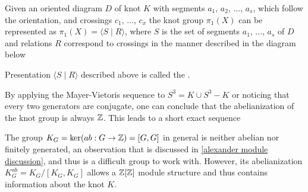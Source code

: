 \begin{definition}
  Given an oriented diagram $D$ of knot $K$ with segments $a_1$, $a_2$, ..., $a_s$, which follow the orientation, and crossings $c_1$, ..., $c_x$ the knot group $\pi_1(X)$ can be represented as $\pi_1(X)=\langle S\;|\;R\rangle$, where $S$ is the set of segments $a_1$, ..., $a_s$ of $D$ and relations $R$ correspond to crossings in the manner described in the diagram below
  \begin{center}
  \end{center}
  Presentation $\langle S\;|\;R\rangle$ described above is called the  \cite[Chapter~6]{livingstone}.
\end{definition}

By applying the Mayer-Vietoris sequence to $S^3=K\cup S^3-K$ or noticing that every two generators are conjugate, one can conclude that the abelianization of the knot group is always $\operatorname{\mathbb{Z}}$. This leads to a short exact sequence
\begin{center}
\end{center}

The group $K_G=\ker(ab:G\to\operatorname{\mathbb{Z}})=[G, G]$ in general is neither abelian nor finitely generated, an observation that is discussed in \cref{alexander module discussion}, and thus is a difficult group to work with. However, its abelianization $K_G^{ab}=K_G/[K_G, K_G]$ allows a $\operatorname{\mathbb{Z}}[\operatorname{\mathbb{Z}}]$ module structure and thus contains information about the knot $K$. 

